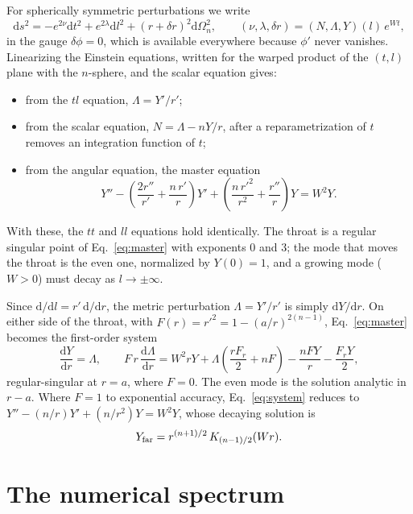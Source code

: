 \documentclass[11pt]{article}
\theoremstyle{remark}
\newcommand{\dd}{\mathrm{d}}
\begin{document}
For spherically symmetric perturbations we write
\begin{equation}
\dd s^2=-e^{2\nu}\dd t^2+e^{2\lambda}\dd l^2+(r+\delta r)^2\dd\Omega_n^2,\qquad
(\nu,\lambda,\delta r)=(N,\Lambda,Y)(l)\,e^{Wt},
\end{equation}
in the gauge $\delta\phi=0$, which is available everywhere because $\phi'$ never vanishes. Linearizing the Einstein
equations, written for the warped product of the $(t,l)$ plane with the $n$-sphere, and the scalar equation gives:
\begin{itemize}
\item from the $tl$ equation, $\Lambda=Y'/r'$;
\item from the scalar equation, $N=\Lambda-nY/r$, after a reparametrization of $t$ removes an
  integration function of $t$;
\item from the angular equation, the master equation
\begin{equation}
Y''-\left(\frac{2r''}{r'}+\frac{n\,r'}{r}\right)Y'+\left(\frac{n\,r'^2}{r^2}+\frac{r''}{r}\right)Y=W^2Y.\label{eq:master}
\end{equation}
\end{itemize}
With these, the $tt$ and $ll$ equations hold identically. The throat is a regular singular point of
Eq.~\eqref{eq:master} with exponents $0$ and $3$; the mode that moves the throat is the even one, normalized by
$Y(0)=1$, and a growing mode ($W>0$) must decay as $l\to\pm\infty$.

Since $\dd/\dd l=r'\,\dd/\dd r$, the metric perturbation $\Lambda=Y'/r'$ is simply $\dd Y/\dd r$. On either side of the
throat, with $F(r)=r'^2=1-(a/r)^{2(n-1)}$, Eq.~\eqref{eq:master} becomes the first-order system
\begin{equation}
\frac{\dd Y}{\dd r}=\Lambda,\qquad
F\,r\,\frac{\dd\Lambda}{\dd r}=W^2rY+\Lambda\left(\frac{rF_r}{2}+nF\right)-\frac{nFY}{r}-\frac{F_rY}{2},\label{eq:system}
\end{equation}
regular-singular at $r=a$, where $F=0$. The even mode is the solution analytic in $r-a$. Where $F=1$ to exponential
accuracy, Eq.~\eqref{eq:system} reduces to $Y''-(n/r)Y'+(n/r^2)Y=W^2Y$, whose decaying solution is
\begin{equation}
Y_{\rm far}=r^{(n+1)/2}\,K_{(n-1)/2}(Wr).\label{eq:far}
\end{equation}

\section{The numerical spectrum}\label{sec:numerics}
\end{document}
